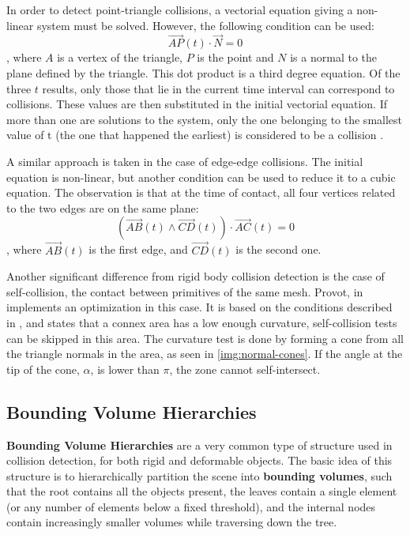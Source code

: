 In order to detect point-triangle collisions, a vectorial equation giving a non-linear system must be solved. However, the following condition can be used: \[\overrightarrow{AP}(t) \cdot \overrightarrow{N} = 0\], where $A$ is a vertex of the triangle, $P$ is the point and $N$ is a normal to the plane defined by the triangle. This dot product is a third degree equation. Of the three $t$ results, only those that lie in the current time interval can correspond to collisions. These values are then substituted in the initial vectorial equation. If more than one are solutions to the system, only the one belonging to the smallest value of t (the one that happened the earliest) is considered to be a collision \citep{provot97}.

A similar approach is taken in the case of edge-edge collisions. The initial equation is non-linear, but another condition can be used to reduce it to a cubic equation. The observation is that at the time of contact, all four vertices related to the two edges are on the same plane: \[(\overrightarrow{AB}(t) \wedge \overrightarrow{CD}(t)) \cdot \overrightarrow{AC}(t) = 0\], where $\overrightarrow{AB}(t)$ is the first edge, and $\overrightarrow{CD}(t)$ is the second one.


\label{lab:ncones}
Another significant difference from rigid body collision detection is the case of self-collision, the contact between primitives of the same mesh. Provot, in \citep{provot97} implements an optimization in this case. It is based on the conditions described in \citep{vmt94}, and states that a connex area has a low enough curvature, self-collision tests can be skipped in this area. The curvature test is done by forming a cone from all the triangle normals in the area, as seen in \autoref{img:normal-cones}. If the angle at the tip of the cone, $\alpha$, is lower than $\pi$, the zone cannot self-intersect.

\subsection{Bounding Volume Hierarchies}
\label{sub-sec:bvh}

\textbf{Bounding Volume Hierarchies} are a very common type of structure used in collision detection, for both rigid and deformable objects. The basic idea of this structure is to hierarchically partition the scene into \textbf{bounding volumes}, such that the root contains all the objects present, the leaves contain a single element (or any number of elements below a fixed threshold), and the internal nodes contain increasingly smaller volumes while traversing down the tree.


